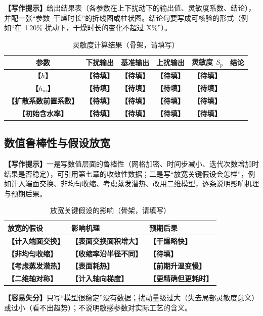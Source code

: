\documentclass[12pt,a4paper]{article}
\newcommand{\prompt}[1]{\par\noindent\textbf{【写作提示】}#1\par}      %
\newcommand{\pitfall}[1]{\par\noindent\textbf{【容易失分】}#1\par}     %
\newcommand{\ph}[1]{\textbf{【#1】}}                                   %
\begin{document}
\prompt{给出结果表（各参数在上下扰动下的输出值、灵敏度系数、结论），并配一张“参数–干燥时长”的折线图或柱状图。结论句要写成可核验的形式（例如“在 ±20\% 扰动下，干燥时长的变化不超过 X\%”）。}

\begin{table}[H]
\centering
\caption{灵敏度计算结果（骨架，请填写）}
\label{tab:sensitivity-result}
\begin{tabular}{cccccc}
\toprule
参数 & 下扰输出 & 基准输出 & 上扰输出 & 灵敏度 $S_p$ & 结论\\
\midrule
\ph{$h$} & \ph{待填} & \ph{待填} & \ph{待填} & \ph{待填} & \\
\ph{$h_m$} & \ph{待填} & \ph{待填} & \ph{待填} & \ph{待填} & \\
\ph{扩散系数前置系数} & \ph{待填} & \ph{待填} & \ph{待填} & \ph{待填} & \\
\ph{初始含水率} & \ph{待填} & \ph{待填} & \ph{待填} & \ph{待填} & \\
\bottomrule
\end{tabular}
\end{table}

\subsection{数值鲁棒性与假设放宽}

\prompt{一是写数值层面的鲁棒性（网格加密、时间步减小、迭代次数增加时结果是否稳定），可引用第七章的收敛性数据；二是写“放宽关键假设会怎样”，例如计入端面交换、非均匀收缩、考虑蒸发潜热、改用二维模型，逐条说明影响机理与预期后果。}

\begin{table}[H]
\centering
\caption{放宽关键假设的影响（骨架，请填写）}
\label{tab:assumption-relax}
\begin{tabular}{p{3.6cm}p{6.2cm}p{4.4cm}}
\toprule
放宽的假设 & 影响机理 & 预期后果\\
\midrule
\ph{计入端面交换} & \ph{表面交换面积增大} & \ph{干燥略快}\\
\ph{非均匀收缩} & \ph{收缩率沿半径不同} & \ph{待填}\\
\ph{考虑蒸发潜热} & \ph{表面耗热} & \ph{前期升温变慢}\\
\ph{二维轴对称} & \ph{计入轴向梯度} & \ph{更精确但更耗时}\\
\bottomrule
\end{tabular}
\end{table}

\pitfall{只写“模型很稳定”没有数据；扰动量级过大（失去局部灵敏度意义）或过小（看不出趋势）；不说明敏感参数对实际工艺的含义。}
\end{document}
